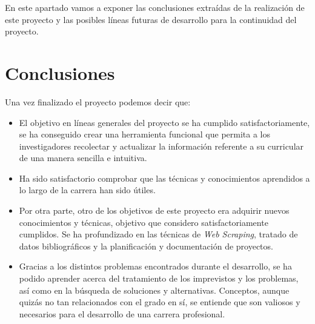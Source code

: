 
En este apartado vamos a exponer las conclusiones extraídas de la realización de este proyecto y las posibles líneas futuras de desarrollo para la continuidad del proyecto.

\section{Conclusiones}

Una vez finalizado el proyecto podemos decir que:
\begin{itemize}
	\item El objetivo en líneas generales del proyecto se ha cumplido satisfactoriamente, se ha conseguido crear una herramienta funcional que permita a los investigadores recolectar y actualizar la información referente a su curricular de una manera sencilla e intuitiva.
	\item Ha sido satisfactorio comprobar que las técnicas y conocimientos aprendidos a lo largo de la carrera han sido útiles. 
	\item Por otra parte, otro de los objetivos de este proyecto era adquirir nuevos conocimientos y técnicas, objetivo que considero satisfactoriamente cumplidos. Se ha profundizado en las técnicas de \emph{Web Scraping}, tratado de datos bibliográficos y la planificación y documentación de proyectos.
	\item Gracias a los distintos problemas encontrados durante el desarrollo, se ha podido aprender acerca del tratamiento de los imprevistos y los problemas, así como en la búsqueda de soluciones y alternativas. Conceptos, aunque quizás no tan relacionados con el grado en sí, se entiende que son valiosos y necesarios para el desarrollo de una carrera profesional.
\end{itemize}

